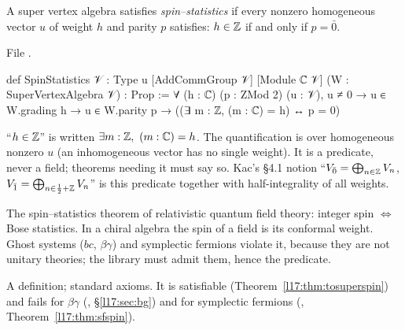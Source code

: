 \begin{definition}\label{l17:def:spinstat}
A super vertex algebra satisfies \emph{spin--statistics} if every nonzero homogeneous vector $u$ of
weight $h$ and parity $p$ satisfies: $h\in{\mathbb{Z}}$ if and only if $p=\bar0$.
\end{definition}
\noindent File .
\begin{leancode}
def SpinStatistics {𝒱 : Type u} [AddCommGroup 𝒱] [Module ℂ 𝒱]
    (W : SuperVertexAlgebra 𝒱) : Prop :=
  ∀ (h : ℂ) (p : ZMod 2) (u : 𝒱), u ≠ 0 → u ∈ W.grading h → u ∈ W.parity p →
    ((∃ m : ℤ, (m : ℂ) = h) ↔ p = 0)
\end{leancode}
\begin{dictionary}
``$h\in{\mathbb{Z}}$'' is written $\exists m:{\mathbb{Z}},\ (m:{\mathbb{C}})=h$. The quantification is over homogeneous nonzero $u$
(an inhomogeneous vector has no single weight). It is a predicate, never a field; theorems needing
it must say so. Kac's §4.1 notion ``$V_{\bar0}=\bigoplus_{n\in{\mathbb{Z}}}V_n$, $V_{\bar1}=\bigoplus_{n\in\frac12+{\mathbb{Z}}}V_n$''
is this predicate together with half-integrality of all weights.
\end{dictionary}
\begin{physics}
The spin--statistics theorem of relativistic quantum field theory: integer spin $\Leftrightarrow$
Bose statistics. In a chiral algebra the spin of a field is its conformal weight. Ghost systems
($bc$, $\beta\gamma$) and symplectic fermions violate it, because they are not unitary theories; the
library must admit them, hence the predicate.
\end{physics}
\begin{status}
A definition; standard axioms. It is satisfiable (Theorem~\ref{l17:thm:tosuperspin}) and fails for
$\beta\gamma$ (, §\ref{l17:sec:bg}) and for symplectic fermions
(, Theorem~\ref{l17:thm:sfspin}).
\end{status}

